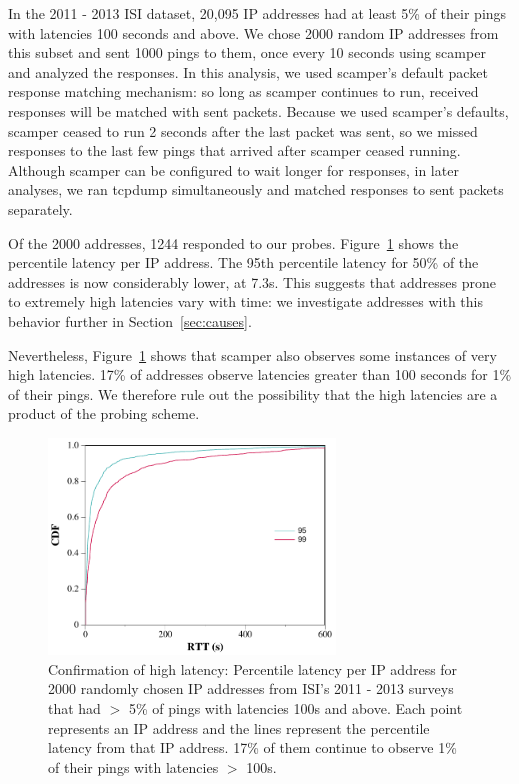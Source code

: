 In the 2011 - 2013
ISI dataset, 20,095 IP
addresses had at least 5\% of their pings with latencies 100 seconds and above. We chose 2000 random IP addresses from
this subset and sent 1000 pings to them, once every 10 seconds using
scamper~\cite{luckie2010scamper} and analyzed the responses. 
In this
analysis, we used scamper's default packet response matching
mechanism: so long as scamper continues to run, received responses
will be matched with sent packets. Because we used scamper's defaults,
scamper ceased to run 2 seconds after the last packet was sent, so
we missed responses to the last few pings that arrived after
scamper ceased running. Although scamper can
be configured to wait longer for responses, in later analyses, we ran tcpdump simultaneously and matched
responses to sent packets separately.

Of the 2000 addresses, 1244 responded to our probes.
Figure~\ref{fig:cdf_high_rtt_ips} shows the percentile latency per IP
address. The 95th percentile latency for 50\% of the addresses is now
considerably lower, at 7.3s. This suggests that addresses prone to extremely high
latencies vary with time: we investigate addresses with
this behavior further in Section~\ref{sec:causes}. 

Nevertheless, Figure~\ref{fig:cdf_high_rtt_ips} shows that scamper
also observes some instances of very high latencies. 17\%
of addresses observe latencies greater than 100 seconds for 1\%
of their pings. We therefore rule out the possibility that the high
latencies are a product of the probing scheme.



\begin{figure}[tb]
\begin{center}
\includegraphics[width=3in]{timeouts/figs/cdf_high_rtt_guys_grand}
\end{center}
\caption{\label{fig:cdf_high_rtt_ips}%
Confirmation of high latency: Percentile latency per IP address for
2000 randomly chosen IP addresses from ISI's 2011 - 2013 surveys that had $>$ 5\% of pings with
latencies 100s and above. Each point represents an IP address and the
lines represent the percentile latency from that IP address. 17\% of
them continue to observe 1\% of their pings with
latencies $>$ 100s.
}
\end{figure}

